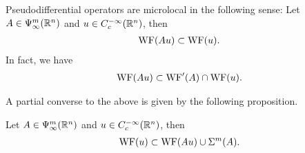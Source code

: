 \documentclass[12pt]{article}
\begin{document}
\begin{fprop}
    Pseudodifferential operators are microlocal in the following sense: 
    Let $A \in \Psi^m_\infty({\mathbb R}^n)$ and $u \in C^{-\infty}_c({\mathbb R}^n)$, then 
    \begin{align}
        \mathrm{WF}(Au) \subset \mathrm{WF}(u). 
    \end{align}
    In fact, we have 
    \begin{align*}
        \mathrm{WF}(Au) \subset \mathrm{WF}'(A) \cap \mathrm{WF}(u). 
    \end{align*}
\end{fprop}


A partial converse to the above is given by the following proposition. \\

\begin{fprop}
    Let $A \in \Psi^m_\infty({\mathbb R}^n)$ and $u \in C^{- \infty}_c({\mathbb R}^n)$, then 
    \begin{align*}
        \mathrm{WF}(u) \subset \mathrm{WF}(Au) \cup \Sigma^m(A).
    \end{align*}
\end{fprop}
\end{document}
